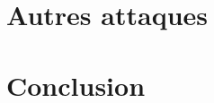 \documentclass{mpg-ep-slides}
\begin{document}
\section[Attaques]{Autres attaques}
\tocsect


\section{Conclusion}
\tocsect

\end{document}

